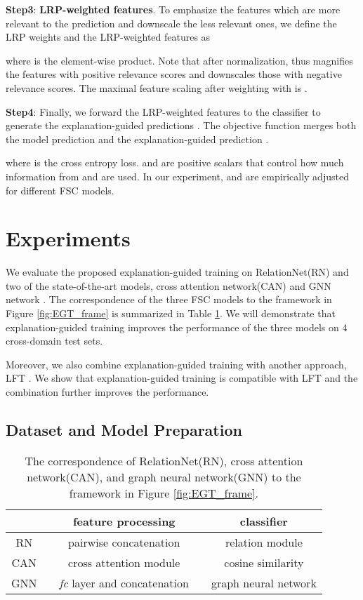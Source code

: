 \documentclass[a4paper,conference]{IEEEtran}
\begin{document}
\textbf{Step3}: \textbf{LRP-weighted features}.
To emphasize the features which are more relevant to the prediction and downscale the less relevant ones, we define the LRP weights and the LRP-weighted features as

where  is the element-wise product. Note that  after normalization, thus  magnifies the features with positive relevance scores and downscales those with negative relevance scores. The maximal feature scaling after weighting with  is .

\textbf{Step4}: Finally, we forward the LRP-weighted features to the classifier to generate the explanation-guided predictions . The objective function merges both the model prediction  and the explanation-guided prediction .
    
where  is the cross entropy loss.  and  are positive scalars that control how much information from  and  are used. In our experiment,  and  are empirically adjusted for different FSC models. 
\section{Experiments}
\label{sec:experiment}
We evaluate the proposed explanation-guided training on RelationNet(RN)\cite{RN:sung2018learning} and two of the state-of-the-art models, cross attention network(CAN) \cite{CAN:hou2019cross} and GNN network \cite{FEWGNN:garcia2018fewshot}. The correspondence of the three FSC models to the framework in Figure \ref{fig:EGT_frame} is summarized in Table \ref{tab:RN_CAN_GNNmodules}. We will demonstrate that explanation-guided training improves the performance of the three models on 4 cross-domain test sets. 

Moreover, we also combine explanation-guided training with another approach, LFT \cite{FeaturewiseTranslayer:tseng2020cross}. We show that explanation-guided training is compatible with LFT and the combination further improves the performance. 

\subsection{Dataset and Model Preparation}
\begin{table}[tb]
    \centering
    \caption{The correspondence of RelationNet(RN), cross attention network(CAN), and graph neural network(GNN) to the framework in Figure \ref{fig:EGT_frame}.}
    \begin{tabular}{c c c c c}
    \hline
            & &  feature processing    & & classifier\\ \hline
        RN  & &  pairwise concatenation& & relation module\\
        CAN & &  cross attention module      & & cosine similarity \\ 
        GNN & &  \textit{fc} layer and concatenation& & graph neural network\\
        \hline
    \end{tabular}
    \label{tab:RN_CAN_GNNmodules}
\end{table}
\end{document}
